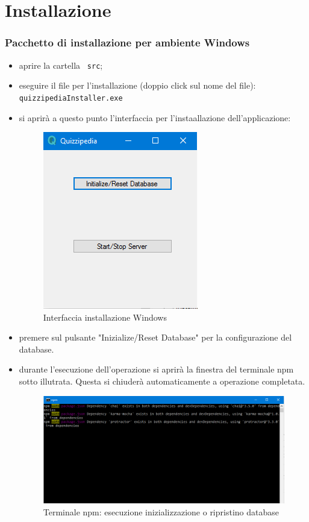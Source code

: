 \documentclass[12pt,a4paper]{article}
\begin{document}
	\newpage
	\section{Installazione}\label{install}
		
		\subsubsection{Pacchetto di installazione per ambiente Windows}
		\begin{itemize}
			\item aprire la cartella \texttt{ src};
			\item eseguire il file per l'installazione (doppio click sul nome del file): \texttt{quizzipediaInstaller.exe}
			\item si aprirà a questo punto l'interfaccia per l'instaallazione dell'applicazione:
			\begin{figure}[H]	
				\centering
				\includegraphics[width=0.4\linewidth]{../img/manualeInstallazione/win_installer01.png}
				\caption{Interfaccia installazione Windows}
				\label{Interfaccia installazione Windows}
			\end{figure}
			
			\item premere sul pulsante "Inizialize/Reset Database" per la configurazione del database. 
			\item durante l'esecuzione dell'operazione si aprirà la finestra del terminale npm sotto illutrata. Questa si chiuderà automaticamente a operazione completata.
			\begin{figure}[H]	
				\centering
				\includegraphics[width=0.8\linewidth]{../img/manualeInstallazione/win_installer02.png}
				\caption{Terminale npm: esecuzione inizializzazione o ripristino database}
				\label{Terminale npm: esecuzione inizializzazione o ripristino database}
			\end{figure}
			

\end{itemize}
\end{document}
